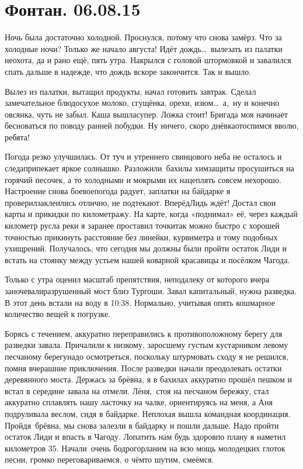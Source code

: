 \chapter{Фонтан. 06.08.15}

Ночь была достаточно холодной. Проснулся, потому что снова замёрз. Что за холодные ночи? Только же начало августа! Идёт дождь\ldots~вылезать из палатки неохота, да и рано ещё, пять утра. Накрылся с головой штормовкой и завалился спать дальше в надежде, что дождь вскоре закончится. Так и вышло. 

Вылез из палатки, вытащил продукты, начал готовить завтрак. Сделал замечательное блюдо\mdash сухое молоко, сгущёнка, орехи, изюм\ldots~а,~ну и конечно овсянка, чуть не забыл. Каша вышла\mdash супер. Ложка стоит! Бригада моя начинает бесноваться по поводу ранней побудки. Ну ничего, скоро днёвка\mdash отоспимся вволю, ребята! 

Погода резко улучшилась. От туч и утреннего свинцового неба не осталось и следа\mdash припекает яркое солнышко. Разложили~бахилы химзащиты просушиться на горячий песочек, а то холодными и мокрыми их нацеплять совсем нехорошо. Настроение снова боевое\mdash погода радует, заплатки на байдарке я проверил\mdash заклеились отлично, не подтекают. Вперёд\mdash Лидь ждёт! Достал свои карты и прикидки по километражу. На карте, когда «поднимал» её, через каждый километр русла реки я заранее проставил точки\mdash так можно быстро с хорошей точностью прикинуть расстояние без линейки, курвиметра и тому подобных ухищрений. Получалось, что сегодня мы должны были пройти остаток Лиди и встать на стоянку между устьем нашей коварной красавицы и посёлком Чагода.

Только с утра оценил масштаб препятствия, неподалеку от которого вчера заночевали\mdash  разрушенный мост близ Тургоши. Завал капитальный, нужна разведка. В этот день встали на воду в 10:38. Нормально, учитывая опять кошмарное количество вещей к погрузке. 

Борясь с течением, аккуратно переправились к противоположному берегу для разведки завала. Причалили к низкому, заросшему густым кустарником левому песчаному берегу\mdash надо осмотреться, поскольку штурмовать сходу я не решился, помня вчерашние приключения. После разведки начали преодолевать остатки деревянного моста. Держась за брёвна, я в бахилах аккуратно прошёл пешком и встал в середине завала на отмели. Лёня,~стоя на песчаном бережку, стал аккуратно сплавлять нашу ласточку на чалке, ориентируясь на меня, а Аня подруливала веслом, сидя в байдарке. Неплохая вышла командная координация. Пройдя~брёвна, мы снова залезли в байдарку и пошли дальше. Надо пройти остаток Лиди и впасть в Чагоду. Лопатить нам будь здоров\mdash по плану я наметил километров 35. Начали~очень бодро\mdash горланим на всю мощь молодецких глоток песни, громко переговариваемся, о чём\sdash то шутим, смеёмся.  

